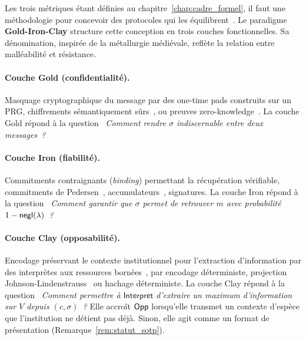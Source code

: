 \begin{sloppypar}
Les trois m\'etriques \'etant d\'efinies au chapitre~\ref{chap:cadre_formel}, il faut une m\'ethodologie pour
concevoir des protocoles qui les \'equilibrent~\cite{Shoup01,Damgard87}. Le paradigme
\textbf{Gold-Iron-Clay} structure cette conception en trois couches
fonctionnelles. Sa d\'enomination, inspir\'ee de la m\'etallurgie m\'edi\'evale,
refl\`ete la relation entre mall\'eabilit\'e et r\'esistance.

\paragraph{Couche Gold (confidentialit\'e).}
Masquage cryptographique du message par des one-time pads construits sur un PRG,
chiffrements s\'emantiquement s\^urs~\cite{GoldwasserMicali84,Bellare97}, ou preuves zero-knowledge~\cite{GMR85,BenOr88}. La couche
Gold r\'epond \`a la question \emph{\guillemotleft~Comment rendre $\sigma$ indiscernable entre deux
messages~?\guillemotright}

\paragraph{Couche Iron (fiabilit\'e).}
Commitments contraignants (\emph{binding}) permettant la r\'ecup\'eration
v\'erifiable, commitments de Pedersen~\cite{Pedersen91,ChaumPedersen92}, accumulateurs~\cite{CamenischLysyanskaya02}, signatures. La couche
Iron r\'epond \`a la question \emph{\guillemotleft~Comment garantir que $\sigma$
permet de retrouver $m$ avec probabilit\'e $1 - \mathsf{negl}(\lambda)$~?\guillemotright}

\paragraph{Couche Clay (opposabilit\'e).}
Encodage pr\'eservant le contexte institutionnel pour l'extraction
d'information par des interpr\`etes aux ressources born\'ees~\cite{Miller56,Simon82}, par encodage
d\'eterministe, projection Johnson-Lindenstrauss~\cite{JohnsonLindenstrauss84,DasguptaGupta03} ou hachage d\'eterministe. La couche
Clay r\'epond \`a la question \emph{\guillemotleft~Comment permettre \`a $\mathsf{Interpret}$ d'extraire
un maximum d'information sur $V$ depuis $(c, \sigma)$~?\guillemotright} Elle accro\^it $\mathsf{Opp}$
lorsqu'elle transmet un contexte d'esp\`ece que l'institution ne d\'etient pas d\'ej\`a. Sinon, elle agit
comme un format de pr\'esentation (Remarque~\ref{rem:statut_sotp}).


\end{sloppypar}
